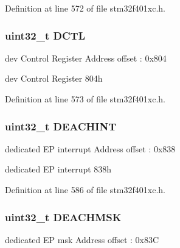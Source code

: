 Definition at line 572 of file stm32f401xc.\+h.

\subsubsection[{\texorpdfstring{D\+C\+TL}{DCTL}}]{ uint32\+\_\+t D\+C\+TL}\hypertarget{struct_u_s_b___o_t_g___device_type_def_adc1bdc4e76749ccda09c92e885b164ad}{}\label{struct_u_s_b___o_t_g___device_type_def_adc1bdc4e76749ccda09c92e885b164ad}
dev Control Register Address offset \+: 0x804

dev Control Register 804h 

Definition at line 573 of file stm32f401xc.\+h.

\subsubsection[{\texorpdfstring{D\+E\+A\+C\+H\+I\+NT}{DEACHINT}}]{ uint32\+\_\+t D\+E\+A\+C\+H\+I\+NT}\hypertarget{struct_u_s_b___o_t_g___device_type_def_ae85e8a65a72f52a9daf3d2b66b77c2e2}{}\label{struct_u_s_b___o_t_g___device_type_def_ae85e8a65a72f52a9daf3d2b66b77c2e2}
dedicated EP interrupt Address offset \+: 0x838

dedicated EP interrupt 838h 

Definition at line 586 of file stm32f401xc.\+h.

\subsubsection[{\texorpdfstring{D\+E\+A\+C\+H\+M\+SK}{DEACHMSK}}]{ uint32\+\_\+t D\+E\+A\+C\+H\+M\+SK}\hypertarget{struct_u_s_b___o_t_g___device_type_def_a0234d794aba7ddae31f3da3c02c8a673}{}\label{struct_u_s_b___o_t_g___device_type_def_a0234d794aba7ddae31f3da3c02c8a673}
dedicated EP msk Address offset \+: 0x83C

